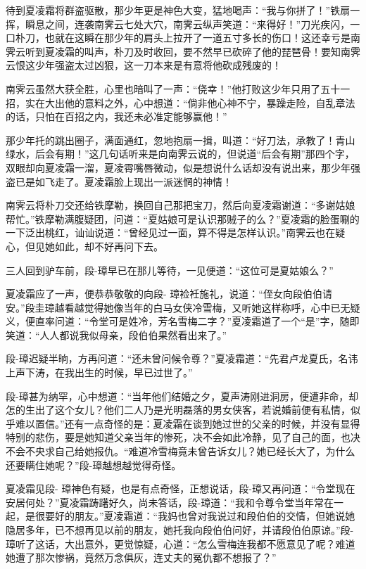 \documentclass[12pt,oneside]{book}
\begin{document}
待到夏凌霜将群盗驱散，那少年更是神色大变，猛地喝声：``我与你拼了！''铁扇一挥，瞬息之间，连袭南霁云七处大穴，南霁云纵声笑道：``来得好！''刀光疾闪，一口朴刀，也就在这瞬在那少年的肩头上拉开了一道五寸多长的伤口！这还幸亏是南霁云听到夏凌霜的叫声，朴刀及时收回，要不然早已砍碎了他的琵琶骨！要知南霁云恨这少年强盗太过凶狠，这一刀本来是有意将他砍成残废的！

南霁云虽然大获全胜，心里也暗叫了一声：``侥幸！''他打败这少年只用了五十一招，实在大出他的意料之外，心中想道：``倘非他心神不宁，暴躁走险，自乱章法的话，只怕在百招之内，我还未必准定能够赢他！''

那少年托的跳出圈子，满面通红，忽地抱扇一揖，叫道：``好刀法，承教了！青山绿水，后会有期！''这几句话听来是向南霁云说的，但说道``后会有期''那四个字，双眼却向夏凌霜一溜，夏凌霄嘴唇微动，似是想说什么话却没有说出来，那少年强盗已是如飞走了。夏凌霜脸上现出一派迷惘的神情！

南霁云将朴刀交还给铁摩勒，换回自己那把宝刀，然后向夏凌霜谢道：``多谢姑娘帮忙。''铁摩勒满腹疑团，问道：``夏姑娘可是认识那贼子的么？''夏凌霜的脸蛋唰的一下泛出桃红，讪讪说道：``曾经见过一面，算不得是怎样认识。''南霁云也在疑心，但见她如此，却不好再问下去。

三人回到驴车前，段-璋早已在那儿等待，一见便道：``这位可是夏姑娘么？''

夏凌霜应了一声，便恭恭敬敬的向段-
璋裣衽施礼，说道：``侄女向段伯伯请安。''段圭璋越看越觉得她像当年的白马女侠冷雪梅，又听她这样称呼，心中已无疑义，便直率问道：``令堂可是姓冷，芳名雪梅二字？''夏凌霜道了一个``是''字，随即笑道：``人人都说我似母亲，段伯伯果然看出来了。''

段-璋迟疑半晌，方再问道：``还未曾问候令尊？''夏凌霜道：``先君卢龙夏氏，名讳上声下涛，在我出生的时候，早已过世了。''

段-璋甚为纳罕，心中想道：``当年他们结婚之夕，夏声涛刚进洞房，便遭非命，却怎的生出了这个女儿？他们二人乃是光明磊落的男女侠客，若说婚前便有私情，似乎难以置信。''还有一点奇怪的是：夏凌霜在谈到她过世的父亲的时候，并没有显得特别的悲伤，要是她知道父亲当年的惨死，决不会如此冷静，见了自己的面，也决不会不央求自己给她报仇。``难道冷雪梅竟未曾告诉女儿？她已经长大了，为什么还要瞒住她呢？''段-璋越想越觉得奇怪。

夏凌霜见段-
璋神色有疑，也是有点奇怪，正想说话，段-璋又再问道：``令堂现在安居何处？''夏凌霜踌躇好久，尚未答话，段-璋道：``我和令尊令堂当年常在一起，是很要好的朋友。''夏凌霜道：``我妈也曾对我说过和段伯伯的交情，但她说她隐居多年，已不想再见以前的朋友，她托我向段伯伯问好，并请段伯伯原谅。''段-璋听了这话，大出意外，更觉惊疑，心道：``怎么雪梅连我都不愿意见了呢？难道她遭了那次惨祸，竟然万念俱灰，连丈夫的冤仇都不想报了？''
\end{document}
